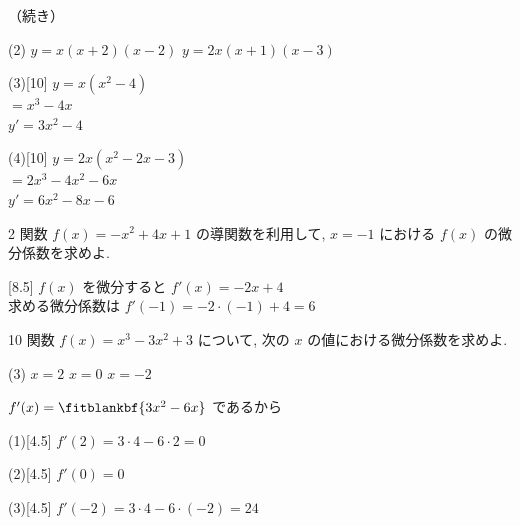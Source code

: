 \documentclass[14pt,dvipdfmx]{jsarticle}
\begin{document}
\vfill
\nextpage

\vspace{-1.4zw}%
\quad（続き）
\begin{tasks}[label=(\arabic*), label-width=1.6zw, item-indent=2zw, after-item-skip=0.08em, start=3](2)
  \task $y=x(x+2)(x-2)$
  \task $y=2x(x+1)(x-3)$
\end{tasks}
\vspace{-0.2em}
\noindent
\begin{minipage}[t]{0.49\linewidth}
\begin{answerbox}{(3)}[10]
  $y=x(x^{2}-4)$\\[0.15em]
  $=x^{3}-4x$\\[0.15em]
  $y'=3x^{2}-4$
\end{answerbox}
\end{minipage}\hfill
\begin{minipage}[t]{0.49\linewidth}
\begin{answerbox}{(4)}[10]
  $y=2x(x^{2}-2x-3)$\\[0.1em]
  $=2x^{3}-4x^{2}-6x$\\[0.15em]
  $y'=6x^{2}-8x-6$
\end{answerbox}
\end{minipage}

\vspace{0.15em}
\begin{exampleprob}{2}
  関数 $f(x)=-x^{2}+4x+1$ の導関数を利用して,
  $x=-1$ における $f(x)$ の微分係数を求めよ.
\end{exampleprob}
\vspace{0.5em}
\begin{answerbox}{}[8.5]
  $f(x)$ を微分すると $f'(x)=-2x+4$\\[0.3em]
  求める微分係数は $f'(-1)=-2\cdot(-1)+4=6$
\end{answerbox}

\vspace{0.5em}
\begin{practiceprob}{10}
  関数 $f(x)=x^{3}-3x^{2}+3$ について,
  次の $x$ の値における微分係数を求めよ.
  \begin{tasks}[label=(\arabic*), label-width=1.6zw, item-indent=2zw, after-item-skip=0.02em](3)
    \task $x=2$
    \task $x=0$
    \task $x=-2$
  \end{tasks}
\end{practiceprob}
\vspace{1em}
\noindent
$f'(x)=\fitblankbf{3x^{2}-6x}$ であるから
\par\vspace{0.5em}
\begin{answerbox}{(1)}[4.5]
  $f'(2)=3\cdot 4-6\cdot 2=0$
\end{answerbox}
\vspace{-0.25em}
\begin{answerbox}{(2)}[4.5]
  $f'(0)=0$
\end{answerbox}
\vspace{-0.25em}
\begin{answerbox}{(3)}[4.5]
  $f'(-2)=3\cdot 4-6\cdot(-2)=24$
\end{answerbox}
\end{document}
